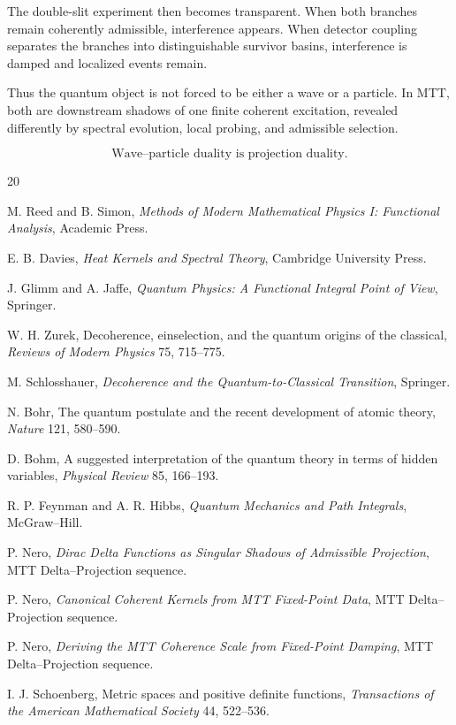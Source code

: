\documentclass[11pt]{article}
\begin{document}
The double-slit experiment then becomes transparent. When both branches remain coherently
admissible, interference appears. When detector coupling separates the branches into
distinguishable survivor basins, interference is damped and localized events remain.

Thus the quantum object is not forced to be either a wave or a particle. In MTT, both are
downstream shadows of one finite coherent excitation, revealed differently by spectral
evolution, local probing, and admissible selection.

\[
  \boxed{\text{Wave--particle duality is projection duality.}}
\]

\begin{thebibliography}{20}

M. Reed and B. Simon,
\emph{Methods of Modern Mathematical Physics I: Functional Analysis},
Academic Press.

E. B. Davies,
\emph{Heat Kernels and Spectral Theory},
Cambridge University Press.

J. Glimm and A. Jaffe,
\emph{Quantum Physics: A Functional Integral Point of View},
Springer.

W. H. Zurek,
Decoherence, einselection, and the quantum origins of the classical,
\emph{Reviews of Modern Physics} 75, 715--775.

M. Schlosshauer,
\emph{Decoherence and the Quantum-to-Classical Transition},
Springer.

N. Bohr,
The quantum postulate and the recent development of atomic theory,
\emph{Nature} 121, 580--590.

D. Bohm,
A suggested interpretation of the quantum theory in terms of hidden variables,
\emph{Physical Review} 85, 166--193.

R. P. Feynman and A. R. Hibbs,
\emph{Quantum Mechanics and Path Integrals},
McGraw--Hill.

P. Nero,
\emph{Dirac Delta Functions as Singular Shadows of Admissible Projection},
MTT Delta--Projection sequence.

P. Nero,
\emph{Canonical Coherent Kernels from MTT Fixed-Point Data},
MTT Delta--Projection sequence.

P. Nero,
\emph{Deriving the MTT Coherence Scale from Fixed-Point Damping},
MTT Delta--Projection sequence.


I. J. Schoenberg,
Metric spaces and positive definite functions,
\emph{Transactions of the American Mathematical Society} 44, 522--536.


\end{thebibliography}
\end{document}
